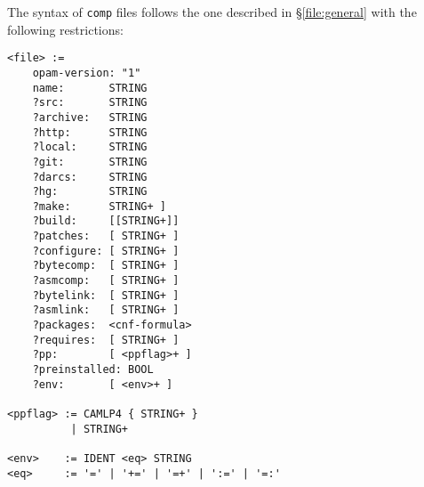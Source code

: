\documentclass[a4paper,10pt]{article}
\begin{document}
The syntax of {\tt comp} files follows the one described in
\S\ref{file:general} with the following restrictions:

{
\begin{Verbatim}[frame=single]
<file> :=
    opam-version: "1"
    name:       STRING
    ?src:       STRING
    ?archive:   STRING
    ?http:      STRING
    ?local:     STRING
    ?git:       STRING
    ?darcs:     STRING
    ?hg:        STRING
    ?make:      STRING+ ]
    ?build:     [[STRING+]]
    ?patches:   [ STRING+ ]
    ?configure: [ STRING+ ]
    ?bytecomp:  [ STRING+ ]
    ?asmcomp:   [ STRING+ ]
    ?bytelink:  [ STRING+ ]
    ?asmlink:   [ STRING+ ]
    ?packages:  <cnf-formula>
    ?requires:  [ STRING+ ]
    ?pp:        [ <ppflag>+ ]
    ?preinstalled: BOOL
    ?env:       [ <env>+ ]

<ppflag> := CAMLP4 { STRING+ }
          | STRING+

<env>    := IDENT <eq> STRING
<eq>     := '=' | '+=' | '=+' | ':=' | '=:'
\end{Verbatim}
}
\end{document}
